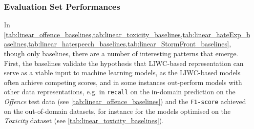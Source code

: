 \subsubsection{Evaluation Set Performances}
In \cref{tab:linear_offence_baselines,tab:linear_toxicity_baselines,tab:linear_hateExp_baselines,tab:linear_hatespeech_baselines,tab:linear_StormFront_baselines}, though only baselines, there are a number of interesting patterns that emerge.
First, the baselines validate the hypothesis that LIWC-based representation can serve as a viable input to machine learning models, as the LIWC-based models often achieve competing scores, and in some instances out-perform models with other data representations, e.g. in \texttt{recall} on the in-domain prediction on the \textit{Offence} test data (see \cref{tab:linear_offence_baselines}) and the \texttt{F1-score} achieved on the out-of-domain datasets, for instance for the models optimised on the \textit{Toxicity} dataset (see \cref{tab:linear_toxicity_baselines}).
